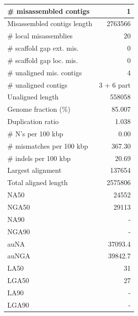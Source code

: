\documentclass[12pt,a4paper]{article}
\begin{document}
\begin{table}[ht]
\begin{center}
\begin{tabular}{|l*{1}{|r}|}
\# misassembled contigs & 1 \\ \hline
Misassembled contigs length & 2763566 \\ \hline
\# local misassemblies & 20 \\ \hline
\# scaffold gap ext. mis. & 0 \\ \hline
\# scaffold gap loc. mis. & 0 \\ \hline
\# unaligned mis. contigs & 4 \\ \hline
\# unaligned contigs & 3 + 6 part \\ \hline
Unaligned length & 558058 \\ \hline
Genome fraction (\%) & 85.007 \\ \hline
Duplication ratio & 1.038 \\ \hline
\# N's per 100 kbp & 0.00 \\ \hline
\# mismatches per 100 kbp & 367.30 \\ \hline
\# indels per 100 kbp & 20.69 \\ \hline
Largest alignment & 137654 \\ \hline
Total aligned length & 2575806 \\ \hline
NA50 & 24552 \\ \hline
NGA50 & 29113 \\ \hline
NA90 & - \\ \hline
NGA90 & - \\ \hline
auNA & 37093.4 \\ \hline
auNGA & 39842.7 \\ \hline
LA50 & 31 \\ \hline
LGA50 & 27 \\ \hline
LA90 & - \\ \hline
LGA90 & - \\ \hline
\end{tabular}
\end{center}
\end{table}
\end{document}
